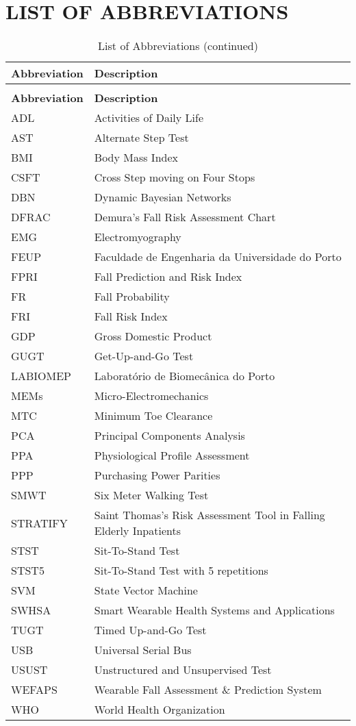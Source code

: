\chapter*{\MakeUppercase{List of Abbreviations}}

\begin{longtable}{p{} p{}}
\toprule
\textbf{Abbreviation} & \textbf{Description} \\
\midrule
\endfirsthead
\caption[]{List of Abbreviations (continued)} \\
\toprule
\textbf{Abbreviation} & \textbf{Description} \\
\midrule
\endhead
\bottomrule
\endfoot
ADL & Activities of Daily Life \\
AST & Alternate Step Test \\
BMI & Body Mass Index \\
CSFT & Cross Step moving on Four Stops \\
DBN & Dynamic Bayesian Networks \\
DFRAC & Demura's Fall Risk Assessment Chart \\
EMG & Electromyography \\
FEUP & Faculdade de Engenharia da Universidade do Porto \\
FPRI & Fall Prediction and Risk Index \\
FR & Fall Probability \\
FRI & Fall Risk Index \\
GDP & Gross Domestic Product \\
GUGT & Get-Up-and-Go Test \\
LABIOMEP & Laboratório de Biomecânica do Porto \\
MEMs & Micro-Electromechanics \\
MTC & Minimum Toe Clearance \\
PCA & Principal Components Analysis \\
PPA & Physiological Profile Assessment \\
PPP & Purchasing Power Parities \\
SMWT & Six Meter Walking Test \\
STRATIFY & Saint Thomas's Risk Assessment Tool in Falling Elderly Inpatients \\
STST & Sit-To-Stand Test \\
STST5 & Sit-To-Stand Test with 5 repetitions \\
SVM & State Vector Machine \\
SWHSA & Smart Wearable Health Systems and Applications \\
TUGT & Timed Up-and-Go Test \\
USB & Universal Serial Bus \\
USUST & Unstructured and Unsupervised Test \\
WEFAPS & Wearable Fall Assessment \& Prediction System \\
WHO & World Health Organization \\
\end{longtable}



